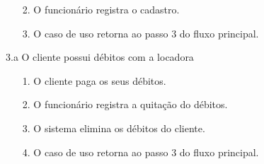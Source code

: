 \documentclass[12pt]{exam}
\begin{document}
\begin{questions}
\begin{parts}
\begin{usecase}
{\begin{enumerate}
			\item[2.] O funcionário registra o cadastro.
			\item[3.] O caso de uso retorna ao passo 3 do fluxo principal.
			\end{enumerate}
		\item[3.a] O cliente possui débitos com a locadora
			\begin{enumerate}
			\item[1.] O	cliente paga os seus débitos.		
			\item[2.] O funcionário registra a quitação do débitos.
			\item[3.] O sistema elimina os débitos do cliente.
			\item[4.] O caso de uso retorna ao passo 3 do fluxo principal.
			\end{enumerate}
	}
	\end{usecase}
    \end{parts}
%      
%      
%      
    
    
    
    
    
      
      
        
      
      
  \end{questions}
\end{document}
